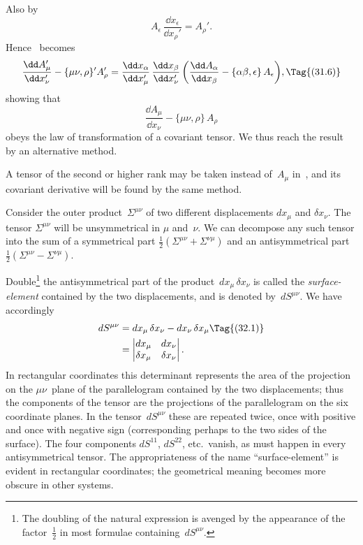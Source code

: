 \documentclass[12pt]{book}
\begin{document}
Also by~
\[
A_{\epsilon}\, \frac{\dd x_{\epsilon}}{\dd x_{\rho}'} = A_{\rho}'.
\]
Hence ~becomes
\[
\frac{\dd A_{\mu}'}{\dd x_{\nu}'} - \{\mu\nu, \rho\}' A_{\rho}'
= \frac{\dd x_{\alpha}}{\dd x_{\mu}'}\, \frac{\dd x_{\beta}}{\dd x_{\nu}'} \left(\frac{\dd A_{\alpha}}{\dd x_{\beta}} - \{\alpha\beta, \epsilon\}\, A_{\epsilon}\right)\!,
\Tag{(31.6)}
\]
showing that
\[
\frac{\dd A_{\mu}}{\dd x_{\nu}} - \{\mu\nu, \rho\}\, A_{\rho}
\]
obeys the law of transformation of a covariant tensor. We thus reach the
result~ by an alternative method.

A tensor of the second or higher rank may be taken instead of~$A_{\mu}$ in~,
and its covariant derivative will be found by the same method.


{\Loosen Consider the outer product~$\Sigma^{\mu\nu}$ of two different displacements $dx_{\mu}$ and $\delta x_{\nu}$.
The tensor $\Sigma^{\mu\nu}$ will be unsymmetrical in $\mu$ and~$\nu$. We can decompose any
such tensor into the sum of a symmetrical part $\frac{1}{2}(\Sigma^{\mu\nu} + \Sigma^{\nu\mu})$ and an antisymmetrical
part $\frac{1}{2}(\Sigma^{\mu\nu} - \Sigma^{\nu\mu})$.}

Double\footnote
  {The doubling of the natural expression is avenged by the appearance of the factor~$\frac{1}{2}$ in most
  formulae containing~$dS^{\mu\nu}$.}
the antisymmetrical part of the product~$dx_{\mu}\, \delta x_{\nu}$ is called the
\emph{surface\hyp{}element} contained by the two displacements, and is denoted by~$dS^{\mu\nu}$.
%
We have accordingly
\begin{align*}
  dS^{\mu\nu} &= dx_{\mu}\, \delta x_{\nu} - dx_{\nu}\, \delta x_{\mu}
\Tag{(32.1)} \\
  &= \left\lvert\begin{array}{@{}cc@{}}
  dx_{\mu} & dx_{\nu} \\
  \delta x_{\mu} & \delta x_{\nu} \\
\end{array}\right\rvert.
\end{align*}
In rectangular coordinates this determinant represents the area of the projection
on the $\mu\nu$~plane of the parallelogram contained by the two displacements;
thus the components of the tensor are the projections of the
parallelogram on the six coordinate planes. In the tensor~$dS^{\mu\nu}$ these are
repeated twice, once with positive and once with negative sign (corresponding
perhaps to the two sides of the surface). The four components $dS^{11}$, $dS^{22}$, etc.\
vanish, as must happen in every antisymmetrical tensor. The appropriateness
\index{Antisymmetrical tensors}%
of the name ``surface\hyp{}element'' is evident in rectangular coordinates; the
geometrical meaning becomes more obscure in other systems.
\end{document}
